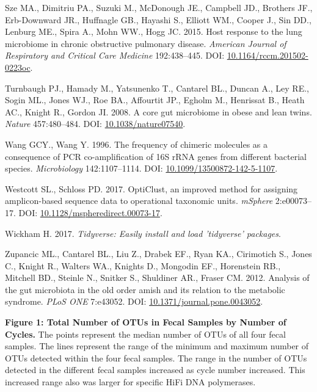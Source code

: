 \documentclass[11pt,]{article}
\begin{document}
\hypertarget{ref-Sze2015}{}
Sze MA., Dimitriu PA., Suzuki M., McDonough JE., Campbell JD., Brothers
JF., Erb-Downward JR., Huffnagle GB., Hayashi S., Elliott WM., Cooper
J., Sin DD., Lenburg ME., Spira A., Mohn WW., Hogg JC. 2015. Host
response to the lung microbiome in chronic obstructive pulmonary
disease. \emph{American Journal of Respiratory and Critical Care
Medicine} 192:438--445. DOI:
\href{https://doi.org/10.1164/rccm.201502-0223oc}{10.1164/rccm.201502-0223oc}.

\hypertarget{ref-Turnbaugh2008}{}
Turnbaugh PJ., Hamady M., Yatsunenko T., Cantarel BL., Duncan A., Ley
RE., Sogin ML., Jones WJ., Roe BA., Affourtit JP., Egholm M., Henrissat
B., Heath AC., Knight R., Gordon JI. 2008. A core gut microbiome in
obese and lean twins. \emph{Nature} 457:480--484. DOI:
\href{https://doi.org/10.1038/nature07540}{10.1038/nature07540}.

\hypertarget{ref-Wang1996}{}
Wang GCY., Wang Y. 1996. The frequency of chimeric molecules as a
consequence of PCR co-amplification of 16S rRNA genes from different
bacterial species. \emph{Microbiology} 142:1107--1114. DOI:
\href{https://doi.org/10.1099/13500872-142-5-1107}{10.1099/13500872-142-5-1107}.

\hypertarget{ref-opticlust_Westcott_2017}{}
Westcott SL., Schloss PD. 2017. OptiClust, an improved method for
assigning amplicon-based sequence data to operational taxonomic units.
\emph{mSphere} 2:e00073--17. DOI:
\href{https://doi.org/10.1128/mspheredirect.00073-17}{10.1128/mspheredirect.00073-17}.

\hypertarget{ref-tidyverse_2017}{}
Wickham H. 2017. \emph{Tidyverse: Easily install and load 'tidyverse'
packages}.

\hypertarget{ref-Zupancic2012}{}
Zupancic ML., Cantarel BL., Liu Z., Drabek EF., Ryan KA., Cirimotich S.,
Jones C., Knight R., Walters WA., Knights D., Mongodin EF., Horenstein
RB., Mitchell BD., Steinle N., Snitker S., Shuldiner AR., Fraser CM.
2012. Analysis of the gut microbiota in the old order amish and its
relation to the metabolic syndrome. \emph{PLoS ONE} 7:e43052. DOI:
\href{https://doi.org/10.1371/journal.pone.0043052}{10.1371/journal.pone.0043052}.

\newpage

\textbf{Figure 1: Total Number of OTUs in Fecal Samples by Number of
Cycles.} The points represent the median number of OTUs of all four
fecal samples. The lines represent the range of the minimum and maximum
number of OTUs detected within the four fecal samples. The range in the
number of OTUs detected in the different fecal samples increased as
cycle number increased. This increased range also was larger for
specific HiFi DNA polymerases.
\end{document}
